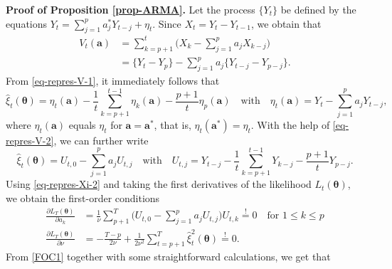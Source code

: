 \textbf{Proof of Proposition \ref{prop-ARMA}.}
Let the process $\{Y_t\}$ be defined by the equations $Y_t = \sum_{j=1}^p a_j^* Y_{t-j} + \eta_t$. Since $X_t = Y_t - Y_{t-1}$, we obtain that 
\begin{align}
V_t(\boldsymbol{a}) 
 & = \sum\limits_{k=p+1}^t \Big( X_k - \sum\limits_{j=1}^p a_j X_{k-j} \Big) \label{eq-repres-V-1} \\
 & = \{ Y_t - Y_p \} - \sum\limits_{j=1}^p a_j \{Y_{t-j} - Y_{p-j}\}. \label{eq-repres-V-2}
\end{align} 
From \eqref{eq-repres-V-1}, it immediately follows that 
\begin{equation}\label{eq-repres-Xi-1}
\widehat{\xi}_t(\boldsymbol{\theta}) = \eta_t(\boldsymbol{a}) - \frac{1}{t} \sum\limits_{k=p+1}^{t-1} \eta_k(\boldsymbol{a}) - \frac{p+1}{t} \eta_p(\boldsymbol{a}) \quad \text{with} \quad \eta_t(\boldsymbol{a}) = Y_t - \sum_{j=1}^p a_j Y_{t-j}, 
\end{equation}
where $\eta_t(\boldsymbol{a})$ equals $\eta_t$ for $\boldsymbol{a} = \boldsymbol{a}^*$, that is, $\eta_t(\boldsymbol{a}^*) = \eta_t$. With the help of \eqref{eq-repres-V-2}, we can further write
\begin{equation}\label{eq-repres-Xi-2}
\widehat{\xi}_t(\boldsymbol{\theta}) = U_{t,0} - \sum\limits_{j=1}^p a_j U_{t,j} \quad \text{with} \quad U_{t,j} = Y_{t-j} - \frac{1}{t} \sum\limits_{k=p+1}^{t-1} Y_{k-j} - \frac{p+1}{t} Y_{p-j}. 
\end{equation}
Using \eqref{eq-repres-Xi-2} and taking the first derivatives of the likelihood $L_t(\boldsymbol{\theta})$, we obtain the first-order conditions
\begin{align} 
\frac{\partial L_T(\boldsymbol{\theta})}{\partial a_k} & = \frac{1}{\nu} \sum\limits_{p+1}^T \Big( U_{t,0} - \sum\limits_{j=1}^p a_j U_{t,j} \Big) U_{t,k} \stackrel{!}{=} 0 \quad \text{for } 1 \le k \le p \label{FOC1} \\
\frac{\partial L_T(\boldsymbol{\theta})}{\partial \nu} & = -\frac{T-p}{2\nu} + \frac{1}{2\nu^2} \sum\limits_{t=p+1}^T \widehat{\xi}_t^2(\boldsymbol{\theta}) \stackrel{!}{=} 0. \label{FOC2}  
\end{align}
From \eqref{FOC1} together with some straightforward calculations, we get that 
